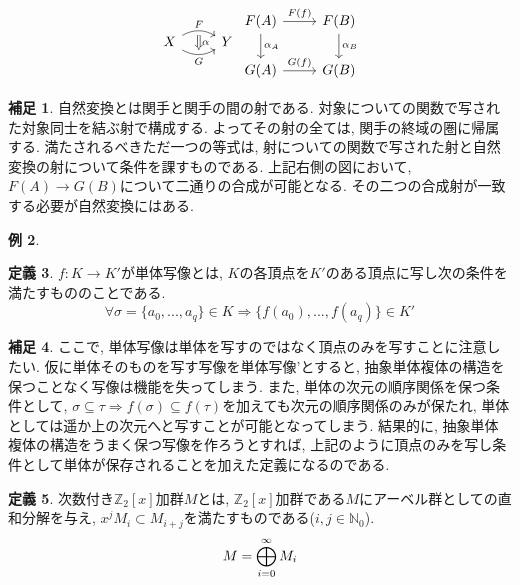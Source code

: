 \documentclass[a4paper]{jsarticle}
\theoremstyle{definition}
\newtheorem{dfn}{定義}[section]
\newtheorem{exam}[dfn]{例}
\newtheorem{hsk}[dfn]{補足}
\begin{document}
\begin{equation}
\begin{tikzcd}
X
\arrow[r, bend left, "F"]
\arrow[r, bend right, swap, "G"]
\arrow[r, phantom, bend left, shift right=0.2ex, ""{name=U}]
\arrow[r, phantom, bend right, shift left=0.2ex, swap, ""{name=D}]
&Y
\arrow[Rightarrow, from=U, to=D, "\alpha"]
\end{tikzcd}
     \begin{tikzcd}
        F(A)\arrow{r}{F(f)} \arrow{d}{\alpha_A} & F(B)\arrow{d}{\alpha_B}\\
        G(A)\arrow{r}{G(f)} & G(B)
    \end{tikzcd}
\end{equation}
\begin{hsk}
    自然変換とは関手と関手の間の射である. 対象についての関数で写された対象同士を結ぶ射で構成する. よってその射の全ては, 関手の終域の圏に帰属する. 満たされるべきただ一つの等式は, 射についての関数で写された射と自然変換の射について条件を課すものである. 上記右側の図において, $F(A)\rightarrow G(B)$について二通りの合成が可能となる. その二つの合成射が一致する必要が自然変換にはある.
\end{hsk}
\begin{exam}
    
\end{exam}
\begin{dfn}
    $f:K\rightarrow K'$が単体写像とは, $K$の各頂点を$K'$のある頂点に写し次の条件を満たすもののことである. 
\begin{equation}
    \forall\sigma =\{a_0,...,a_q\}\in K\Rightarrow \{f(a_0),...,f(a_q)\}\in K'
\end{equation}
\end{dfn}
\begin{hsk}
    ここで, 単体写像は単体を写すのではなく頂点のみを写すことに注意したい. 仮に単体そのものを写す写像を単体写像'とすると, 抽象単体複体の構造を保つことなく写像は機能を失ってしまう. また, 単体の次元の順序関係を保つ条件として, $\sigma\subseteq\tau \Rightarrow f(\sigma) \subseteq f(\tau)$を加えても次元の順序関係のみが保たれ, 単体としては遥か上の次元へと写すことが可能となってしまう. 結果的に, 抽象単体複体の構造をうまく保つ写像を作ろうとすれば, 上記のように頂点のみを写し条件として単体が保存されることを加えた定義になるのである.
\end{hsk}
\begin{dfn}
    次数付き$\mathbb{Z}_2[x]$加群$M$とは, $\mathbb{Z}_2[x]$加群である$M$にアーベル群としての直和分解を与え, $x^jM_i\subset M_{i+j}$を満たすものである($i,j\in\mathbb{N}_0$).
    \begin{equation}
        M=\bigoplus_{i=0}^{\infty} M_i\notag
    \end{equation}
\end{dfn}
\end{document}

